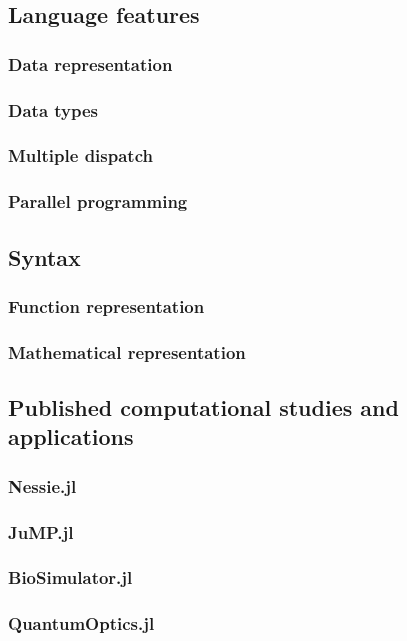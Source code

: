 \subsection{Language features}
\subsubsection{Data representation}
\subsubsection{Data types}
\subsubsection{Multiple dispatch}
\subsubsection{Parallel programming}
\subsection{Syntax}
\subsubsection{Function representation}
\subsubsection{Mathematical representation}
\subsection{Published computational studies and applications}
\subsubsection{Nessie.jl}
\subsubsection{JuMP.jl}
\subsubsection{BioSimulator.jl}
\subsubsection{QuantumOptics.jl}
